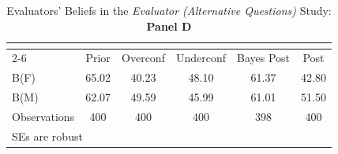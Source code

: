 \begin{table}[htbp]\centering
\caption{Evaluators' Beliefs in the \textit{Evaluator (Alternative Questions)} Study: \textbf{Panel D}}
\begin{tabular}{l*{5}{c}}
\hline\hline
                &\multicolumn{5}{c}{}                             \\\cmidrule(lr){2-6}
                &\multicolumn{1}{c}{Prior}&\multicolumn{1}{c}{Overconf}&\multicolumn{1}{c}{Underconf}&\multicolumn{1}{c}{Bayes Post}&\multicolumn{1}{c}{Post}\\
\hline
B(F)            &    65.02&    40.23&    48.10&    61.37&    42.80\\
B(M)            &    62.07&    49.59&    45.99&    61.01&    51.50\\
\hline
Observations    &      400&      400&      400&      398&      400\\
\hline\hline
\multicolumn{6}{l}{\footnotesize SEs are robust}\\
\end{tabular}
\end{table}
